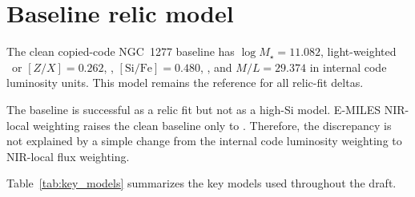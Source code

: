 \section{Baseline relic model}

The clean copied-code NGC~1277 baseline has $\log M_\star=11.082$, light-weighted \mh\ or $[Z/X]=0.262$, , $[\mathrm{Si}/\mathrm{Fe}]=0.480$, , and $M/L=29.374$ in internal code luminosity units. This model remains the reference for all relic-fit deltas.

The baseline is successful as a relic fit but not as a high-Si model. E-MILES NIR-local weighting raises the clean baseline only to . Therefore, the discrepancy is not explained by a simple change from the internal code luminosity weighting to NIR-local flux weighting.

Table~\ref{tab:key_models} summarizes the key models used throughout the draft.


